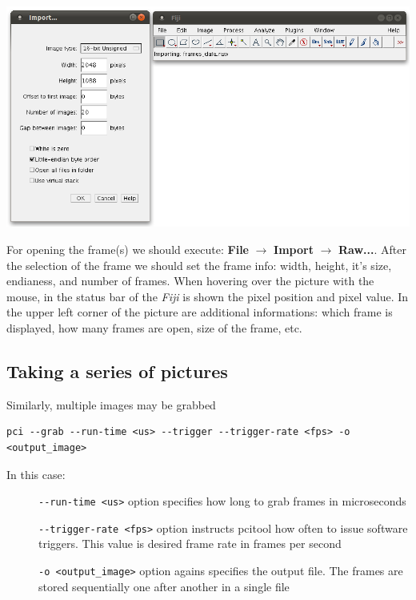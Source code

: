 \includegraphics[width=\textwidth]{images/Fiji_set_param.png}

For opening the frame(s) we should execute: \textbf{File} $\rightarrow $ \textbf{Import} $ \rightarrow $ \textbf{Raw...}. After the selection of the frame we should set the frame info: width, height, it's size, endianess, and number of frames. When hovering over the picture with the mouse, in the status bar of the \emph{Fiji} is shown the pixel position and pixel value. In the upper left corner of the picture are additional informations: which frame is displayed, how many frames are open, size of the frame, etc.




\subsection{Taking a series of pictures}
Similarly, multiple images may be grabbed

\begin{verbatim}
pci --grab --run-time <us> --trigger --trigger-rate <fps> -o <output_image>
\end{verbatim}

In this case:
\begin{description}
\item[ ] \verb/--run-time <us>/ option specifies how long to grab frames in microseconds
\item[ ] \verb/--trigger-rate <fps>/ option instructs pcitool how often to issue software triggers. This value is desired frame rate in frames per second
\item[ ] \verb/-o <output_image>/ option agains specifies the output file. The frames are stored sequentially one after another in a single file
\end{description}


